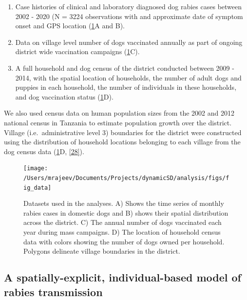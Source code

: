 \documentclass[
  oneside]{book}
\begin{document}
\begin{enumerate}
\def\labelenumi{\arabic{enumi})}
\item
  Case histories of clinical and laboratory diagnosed dog rabies cases between 2002 - 2020 (N = 3224 observations with and approximate date of symptom onset and GPS location (\ref{fig:data}A and B).
\item
  Data on village level number of dogs vaccinated annually as part of ongoing district wide vaccination campaigns (\ref{fig:data}C).
\item
  A full household and dog census of the district conducted between 2009 - 2014, with the spatial location of households, the number of adult dogs and puppies in each household, the number of individuals in these households, and dog vaccination status (\ref{fig:data}D).
\end{enumerate}

We also used census data on human population sizes from the 2002 and 2012 national census in Tanzania to estimate population growth over the district. Village (i.e.~administrative level 3) boundaries for the district were constructed using the distribution of household locations belonging to each village from the dog census data (\ref{fig:data}D, \protect\hyperlink{ref-Mancyinprep}{{[}28{]}}).

\begin{figure}
\texttt{[image: /Users/mrajeev/Documents/Projects/dynamicSD/analysis/figs/fig\_data]} \caption[Datasets on rabies cases, vaccination, and distribution of the dog population used in the analyses.]{Datasets used in the analyses. A) Shows the time series of monthly rabies cases in domestic dogs and B) shows their spatial distribution across the district. C) The annual number of dogs vaccinated each year during mass campaigns. D) The location of household census data with colors showing the number of dogs owned per household. Polygons delineate village boundaries in the district.}\label{fig:data}
\end{figure}



\hypertarget{a-spatially-explicit-individual-based-model-of-rabies-transmission}{%
\subsection{A spatially-explicit, individual-based model of rabies transmission}\label{a-spatially-explicit-individual-based-model-of-rabies-transmission}}
\end{document}
